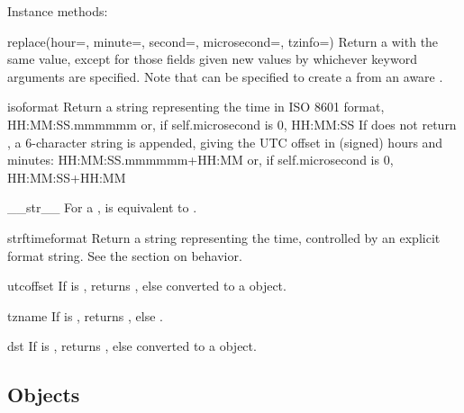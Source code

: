 Instance methods:

\begin{methoddesc}{replace}(hour=, minute=, second=, microsecond=, tzinfo=)
    Return a  with the same value, except for those fields given
    new values by whichever keyword arguments are specified.  Note that
     can be specified to create a {\naive}  from an
    aware .
\end{methoddesc}

\begin{methoddesc}{isoformat}{}
    Return a string representing the time in ISO 8601 format,
        HH:MM:SS.mmmmmm
    or, if self.microsecond is 0,
        HH:MM:SS
    If  does not return , a 6-character
    string is appended, giving the UTC offset in (signed) hours and
    minutes:
        HH:MM:SS.mmmmmm+HH:MM
    or, if self.microsecond is 0,
        HH:MM:SS+HH:MM
\end{methoddesc}

\begin{methoddesc}{__str__}{}
    For a  ,  is equivalent to
    .
\end{methoddesc}

\begin{methoddesc}{strftime}{format}
    Return a string representing the time, controlled by an explicit
    format string.  See the section on  behavior.
\end{methoddesc}

\begin{methoddesc}{utcoffset}{}
    If  is , returns , else
     converted to a 
    object.
\end{methoddesc}

\begin{methoddesc}{tzname}{}
    If  is , returns , else
    .
\end{methoddesc}

\begin{methoddesc}{dst}{}
    If  is , returns , else
     converted to a  object.
\end{methoddesc}



\subsection{  Objects \label{datetime-datetimetz}}

